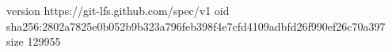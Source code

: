 version https://git-lfs.github.com/spec/v1
oid sha256:2802a7825e0b052b9b323a796feb398f4e7cfd4109adbfd26f990ef26c70a397
size 129955
